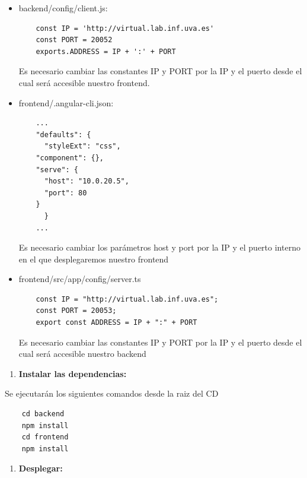\documentclass[openright,twoside,10pt]{book}
\providecommand{\tightlist}{%
  \setlength{\itemsep}{0pt}\setlength{\parskip}{0pt}}
\begin{document}
    \begin{itemize}
    \item
      backend/config/client.js:
    
    \begin{verbatim}
    const IP = 'http://virtual.lab.inf.uva.es'
    const PORT = 20052 
    exports.ADDRESS = IP + ':' + PORT
    \end{verbatim}
    
      Es necesario cambiar las constantes IP y PORT por la IP y el puerto
      desde el cual será accesible nuestro frontend.
    \item
      frontend/.angular-cli.json:
    
    \begin{verbatim}
    ...
    "defaults": {
      "styleExt": "css",
    "component": {},
    "serve": {
      "host": "10.0.20.5",
      "port": 80
    }
      }
    ...
    \end{verbatim}
    
      Es necesario cambiar los parámetros host y port por la IP y el puerto
      interno en el que desplegaremos nuestro frontend
    \item
      frontend/src/app/config/server.ts
    
    \begin{verbatim}
    const IP = "http://virtual.lab.inf.uva.es";
    const PORT = 20053;
    export const ADDRESS = IP + ":" + PORT
    \end{verbatim}
    
      Es necesario cambiar las constantes IP y PORT por la IP y el puerto
      desde el cual será accesible nuestro backend
    \end{itemize}
    
    \begin{enumerate}
    \def\labelenumi{\arabic{enumi}.}
    \setcounter{enumi}{1}
    \tightlist
    \item
      \textbf{Instalar las dependencias:}
    \end{enumerate}
    
    Se ejecutarán los siguientes comandos desde la raiz del CD
    
    \begin{verbatim}
    cd backend
    npm install
    cd frontend
    npm install
    \end{verbatim}
    
    \begin{enumerate}
    \def\labelenumi{\arabic{enumi}.}
    \setcounter{enumi}{2}
    \tightlist
    \item
      \textbf{Desplegar:}
    \end{enumerate}
    
\end{document}
